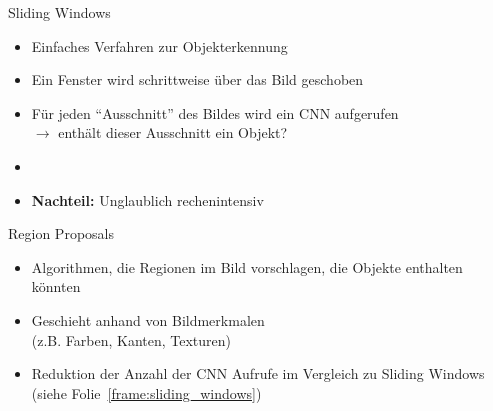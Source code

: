 \documentclass{beamer}
\begin{document}
\begin{frame}{Sliding Windows}\label{frame:sliding_windows}
    \begin{itemize}
        \item Einfaches Verfahren zur Objekterkennung
        \item Ein Fenster wird schrittweise über das Bild geschoben
        \item Für jeden "`Ausschnitt"' des Bildes wird ein CNN aufgerufen\\$\rightarrow$ enthält dieser Ausschnitt ein Objekt?
        \item[]
        \item<2-> \textbf{Nachteil:} Unglaublich rechenintensiv
    \end{itemize}
\end{frame}

\begin{frame}{Region Proposals}
    \begin{itemize}
        \item Algorithmen, die Regionen im Bild vorschlagen, die Objekte enthalten könnten
        \item Geschieht anhand von Bildmerkmalen\\(z.B. Farben, Kanten, Texturen)
        \item Reduktion der Anzahl der CNN Aufrufe im Vergleich zu Sliding Windows (siehe Folie~\ref{frame:sliding_windows})
    \end{itemize}
\end{frame}
\end{document}
